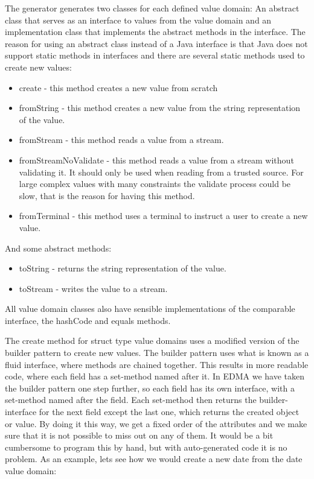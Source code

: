 The generator generates two classes for each defined value domain:
An abstract class that serves as an interface to values from the value
domain and an implementation class that implements the abstract methods
in the interface. The reason for using an abstract class instead of
a Java interface is that Java does not support static methods in interfaces
and there are several static methods used to create new values:
\begin{itemize}
\item create - this method creates a new value from scratch 
\item fromString - this method creates a new value from the string representation
of the value.
\item fromStream - this method reads a value from a stream.
\item fromStreamNoValidate - this method reads a value from a stream without
validating it. It should only be used when reading from a trusted
source. For large complex values with many constraints the validate
process could be slow, that is the reason for having this method.
\item fromTerminal - this method uses a terminal to instruct a user to create
a new value.
\end{itemize}
And some abstract methods:
\begin{itemize}
\item toString - returns the string representation of the value.
\item toStream - writes the value to a stream.
\end{itemize}
All value domain classes also have sensible implementations of the
comparable interface, the hashCode and equals methods.

The create method for struct type value domains uses a modified version
of the builder pattern to create new values. The builder pattern uses
what is known as a fluid interface\cite{fowler2008}, where methods
are chained together. This results in more readable code, where each
field has a set-method named after it. In EDMA we have taken the builder
pattern one step further, so each field has its own interface, with
a set-method named after the field. Each set-method then returns the
builder-interface for the next field except the last one, which returns
the created object or value. By doing it this way, we get a fixed
order of the attributes and we make sure that it is not possible to
miss out on any of them. It would be a bit cumbersome to program this
by hand, but with auto-generated code it is no problem. As an example,
lets see how we would create a new date from the date value domain:

